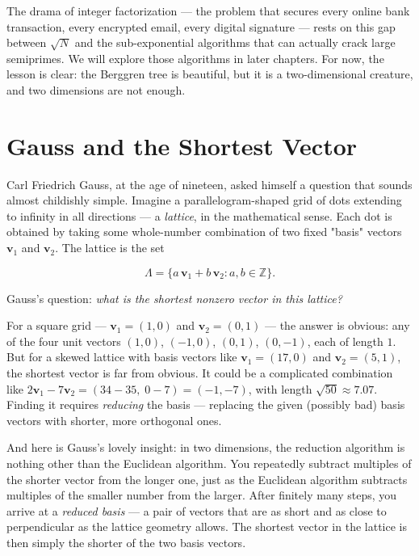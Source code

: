 \documentclass[11pt,openright,twoside]{book}
\theoremstyle{definition}
\begin{document}
The drama of integer factorization --- the problem that secures every online bank transaction, every encrypted email, every digital signature --- rests on this gap between $\sqrt{N}$ and the sub-exponential algorithms that can actually crack large semiprimes. We will explore those algorithms in later chapters. For now, the lesson is clear: the Berggren tree is beautiful, but it is a two-dimensional creature, and two dimensions are not enough.


\bigskip


\section{Gauss and the Shortest Vector}

Carl Friedrich Gauss, at the age of nineteen, asked himself a question that sounds almost childishly simple. Imagine a parallelogram-shaped grid of dots extending to infinity in all directions --- a \textit{lattice}, in the mathematical sense. Each dot is obtained by taking some whole-number combination of two fixed "basis" vectors $\mathbf{v}_1$ and $\mathbf{v}_2$. The lattice is the set

\[
\Lambda = \{a\,\mathbf{v}_1 + b\,\mathbf{v}_2 : a, b \in \mathbb{Z}\}.
\]

Gauss's question: \textit{what is the shortest nonzero vector in this lattice?}

For a square grid --- $\mathbf{v}_1 = (1, 0)$ and $\mathbf{v}_2 = (0, 1)$ --- the answer is obvious: any of the four unit vectors $(1,0)$, $(-1,0)$, $(0,1)$, $(0,-1)$, each of length $1$. But for a skewed lattice with basis vectors like $\mathbf{v}_1 = (17, 0)$ and $\mathbf{v}_2 = (5, 1)$, the shortest vector is far from obvious. It could be a complicated combination like $2\mathbf{v}_1 - 7\mathbf{v}_2 = (34 - 35,\; 0 - 7) = (-1, -7)$, with length $\sqrt{50} \approx 7.07$. Finding it requires \textit{reducing} the basis --- replacing the given (possibly bad) basis vectors with shorter, more orthogonal ones.

And here is Gauss's lovely insight: in two dimensions, the reduction algorithm is nothing other than the Euclidean algorithm. You repeatedly subtract multiples of the shorter vector from the longer one, just as the Euclidean algorithm subtracts multiples of the smaller number from the larger. After finitely many steps, you arrive at a \textit{reduced basis} --- a pair of vectors that are as short and as close to perpendicular as the lattice geometry allows. The shortest vector in the lattice is then simply the shorter of the two basis vectors.
\end{document}
